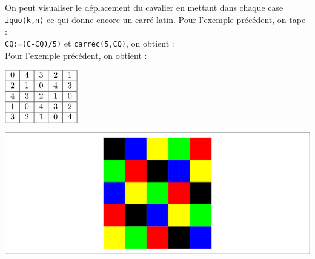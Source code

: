 \documentclass[a4paper,11pt]{book}
\begin{document}
On peut visualiser le d\'eplacement du cavalier en mettant dans chaque case
{\tt iquo(k,n)} ce qui donne encore un carr\'e latin.
Pour l'exemple pr\'ec\'edent, on tape :\\
{\tt CQ:=(C-CQ)/5)} et {\tt carrec(5,CQ)}, on obtient :\\
Pour l'exemple pr\'ec\'edent, on obtient :\\

\begin{minipage}[h]{4cm}
$
\begin{tabular}{|c|c|c|c|c|}
\hline
0&4&3&2&1\\
\hline
2&1&0&4&3\\
\hline
4&3&2&1&0\\
\hline
1&0&4&3&2\\
\hline
3&2&1&0&4\\
\hline
\end{tabular}
$
\end{minipage}
\begin{minipage}[h]{7cm}
\begin{center}\includegraphics[width=\textwidth]{carreml2}\end{center}
\end{minipage}
\end{document}
